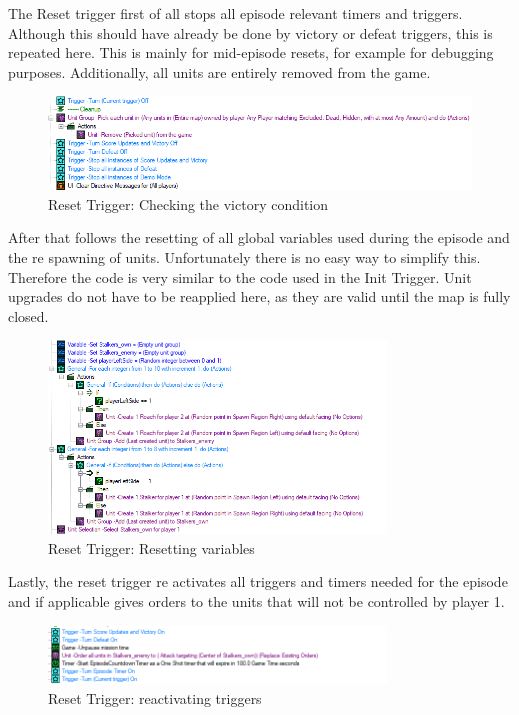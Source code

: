 The Reset trigger first of all stops all episode relevant timers and triggers. Although this should have already be done by victory or defeat triggers, this is repeated here. This is mainly for mid-episode resets, for example for debugging purposes. Additionally, all units are entirely removed from the game.

\begin{figure}[htb]
  \centering
      \includegraphics[width=1\textwidth]{Figures/Triggers/trigger_reset_stopall.png}
  \caption{ Reset Trigger: Checking the victory condition }
\end{figure}

After that follows the resetting of all global variables used during the episode and the re spawning of units.
Unfortunately there is no easy way to simplify this. Therefore the code is very similar to the code used in the Init Trigger. Unit upgrades do not have to be reapplied here, as they are valid until the map is fully closed.

\begin{figure}[htb]
  \centering
      \includegraphics[width=0.8\textwidth]{Figures/Triggers/trigger_reset_resetvars.png}
  \caption{ Reset Trigger: Resetting variables }
\end{figure}

Lastly, the reset trigger re activates all triggers and timers needed for the episode and if applicable gives orders to the units that will not be controlled by player 1.

\begin{figure}[htb]
  \centering
      \includegraphics[width=0.8\textwidth]{Figures/Triggers/trigger_reset_turnon.png}
  \caption{ Reset Trigger: reactivating triggers }
\end{figure}

